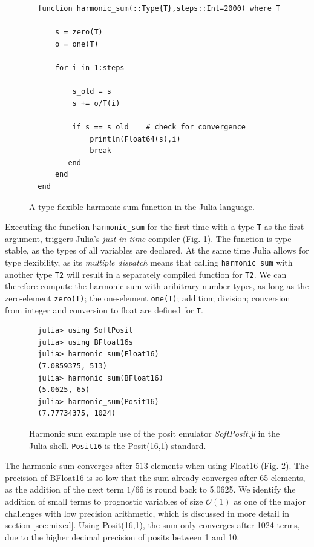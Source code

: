 \documentclass[draft]{agujournal2019}
\begin{document}
\begin{figure}[h]
\small
\begin{verbatim} 
  function harmonic_sum(::Type{T},steps::Int=2000) where T

      s = zero(T)
      o = one(T)

      for i in 1:steps

          s_old = s
          s += o/T(i)

          if s == s_old    # check for convergence
              println(Float64(s),i)
              break
         end
      end
  end
\end{verbatim}
\caption{A type-flexible harmonic sum function in the Julia language.}
\label{fig:harmsum}
\end{figure}

Executing the function \texttt{harmonic\_sum} for the first time with a type \texttt{T} as the first argument, triggers Julia's \emph{just-in-time} compiler (Fig. \ref{fig:harmsum}). The function is type stable, as the types of all variables are declared. At the same time Julia allows for type flexibility, as its \emph{multiple dispatch} means that calling  \texttt{harmonic\_sum} with another type \texttt{T2} will result in a separately compiled function for \texttt{T2}. We can therefore compute the harmonic sum with aribitrary number types, as long as the zero-element \texttt{zero(T)}; the one-element \texttt{one(T)}; addition; division; conversion from integer and conversion to float are defined for \texttt{T}. 

\begin{figure}[h]
\small
\begin{verbatim} 
  julia> using SoftPosit
  julia> using BFloat16s
  julia> harmonic_sum(Float16)
  (7.0859375, 513)
  julia> harmonic_sum(BFloat16)
  (5.0625, 65)
  julia> harmonic_sum(Posit16)
  (7.77734375, 1024)
\end{verbatim}
\caption{Harmonic sum example use of the posit emulator \emph{SoftPosit.jl} in the Julia shell. \texttt{Posit16} is the Posit(16,1) standard.}
\label{fig:harmsum2}
\end{figure}

The harmonic sum converges after 513 elements when using Float16 (Fig. \ref{fig:harmsum2}). The precision of BFloat16 is so low that the sum already converges after 65 elements, as the addition of the next term $1/66$ is round back to 5.0625. We identify the addition of small terms to prognostic variables of size $\mathcal{O}(1)$ as one of the major challenges with low precision arithmetic, which is discussed in more detail in section \ref{sec:mixed}. Using Posit(16,1), the sum only converges after 1024 terms, due to the higher decimal precision of posits between 1 and 10.
\end{document}
